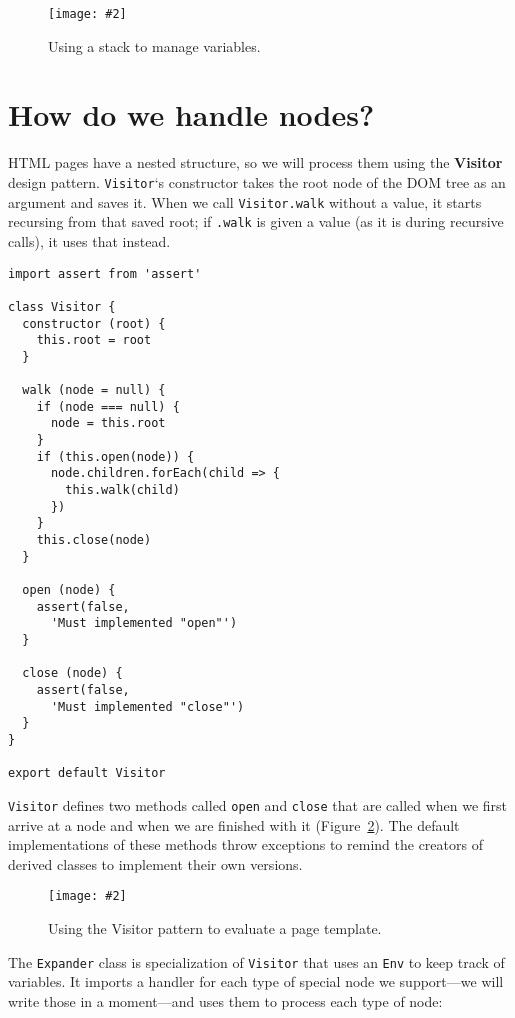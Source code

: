 \documentclass[krantzl]{krantz}
\newcommand{\figpdf}[4]{\begin{figure}%
\centering%
\texttt{[image: \#2]}%
\caption{#3}%
\label{#1}%
\end{figure}}
\newcommand{\figref}[1]{Figure~\ref{#1}}
\newcommand{\glossref}[1]{\textbf{#1}}
\begin{document}
\figpdf{page-templates-stack}{./page-templates/stack.pdf}{Using a stack to manage variables.}{0.6}

\section{How do we handle nodes?}\label{page-templates-nodes}


HTML pages have a nested structure,
so we will process them using
the \glossref{Visitor} design pattern.
\texttt{Visitor}‘s constructor takes the root node of the DOM tree as an argument and saves it.
When we call \texttt{Visitor.walk} without a value,
it starts recursing from that saved root;
if \texttt{.walk} is given a value (as it is during recursive calls),
it uses that instead.


\begin{lstlisting}[frame=tblr]
import assert from 'assert'

class Visitor {
  constructor (root) {
    this.root = root
  }

  walk (node = null) {
    if (node === null) {
      node = this.root
    }
    if (this.open(node)) {
      node.children.forEach(child => {
        this.walk(child)
      })
    }
    this.close(node)
  }

  open (node) {
    assert(false,
      'Must implemented "open"')
  }

  close (node) {
    assert(false,
      'Must implemented "close"')
  }
}

export default Visitor
\end{lstlisting}



\noindent \texttt{Visitor} defines two methods called \texttt{open} and \texttt{close} that are called
when we first arrive at a node and when we are finished with it
(\figref{page-templates-visitor}).
The default implementations of these methods throw exceptions
to remind the creators of derived classes to implement their own versions.

\figpdf{page-templates-visitor}{./page-templates/visitor.pdf}{Using the Visitor pattern to evaluate a page template.}{0.6}


The \texttt{Expander} class is specialization of \texttt{Visitor}
that uses an \texttt{Env} to keep track of variables.
It imports a handler
for each type of special node we support—we will write those in a moment—and
uses them to process each type of node:
\end{document}
